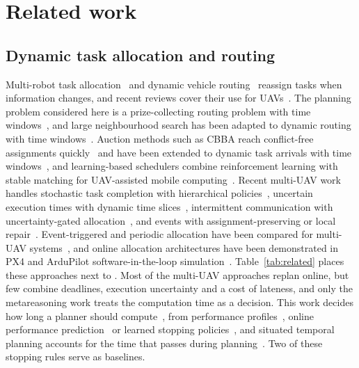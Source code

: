 \section{Related work}\label{sec:related}
\subsection{Dynamic task allocation and routing}
Multi-robot task allocation~\cite{gerkey2004formal,chakraa2023mrta} and dynamic vehicle
routing~\cite{psaraftis2016dynamic,soeffker2022review} reassign tasks when information changes, and recent reviews
cover their use for UAVs~\cite{skaltsis2023review,rojasviloria2021drones}. The planning problem considered here is a
prize-collecting routing problem with time windows~\cite{solomon1987algorithms,vansteenwegen2011orienteering}, and large
neighbourhood search has been adapted to dynamic routing with time windows~\cite{alnsdvrp2024}. Auction methods such
as CBBA reach conflict-free assignments quickly~\cite{choi2009consensus} and have been extended to dynamic task
arrivals with time windows~\cite{wang2022phases}, and learning-based schedulers combine reinforcement learning with
stable matching for UAV-assisted mobile computing~\cite{zhao2025throughput}. Recent multi-UAV work handles stochastic task completion with hierarchical
policies~\cite{choudhury2022dynamic}, uncertain execution times with dynamic time slices~\cite{huang2024dynamic},
intermittent communication with uncertainty-gated allocation~\cite{ucdg2026drones}, and events with
assignment-preserving or local repair~\cite{hwang2026apr,shen2026localrepair}. Event-triggered and periodic allocation
have been compared for multi-UAV systems~\cite{cong2026event}, and online allocation architectures have been
demonstrated in PX4 and ArduPilot software-in-the-loop simulation~\cite{calvo2025heterogeneous,ali2026sitl}. Table~\ref{tab:related}
places these approaches next to \mname{}. Most of the multi-UAV approaches replan online, but few combine deadlines,
execution uncertainty and a cost of lateness, and only the metareasoning work treats the computation time as a
decision. This work decides how long a planner should
compute~\cite{zilberstein1996using,herrmann2023metareasoning}, from performance profiles~\cite{boddy1994deliberation},
online performance prediction~\cite{svegliato2018meta} or learned stopping policies~\cite{sung2021quit}, and situated
temporal planning accounts for the time that passes during planning~\cite{cashmore2018clock,shperberg2021situated}. Two
of these stopping rules serve as baselines.

